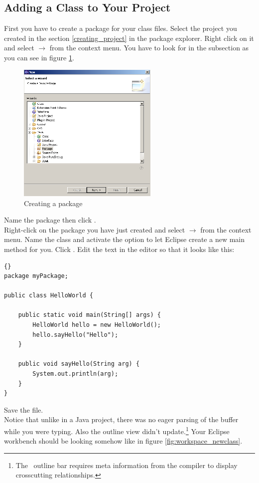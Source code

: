 \subsection{Adding a Class to Your Project}
First you have to create a package for your class files. Select the project you created in the section \ref{creating_project} in the package explorer. Right click on it and select  $\rightarrow$  from the context menu. You have to look for  in the  subsection as you can see in figure \ref{fig:package}.

\begin{figure}[htbp]
	\centering
		\includegraphics[width=0.60\textwidth]{images/package.png}
	\caption{Creating a package}
	\label{fig:package}
\end{figure}

Name the package  then click .\\
Right-click on the package you have just created and select  $\rightarrow$  from the context menu. Name the class  and activate the option to let Eclipse create a new main method for you. Click .
Edit the text in the editor so that it looks like this:
	\begin{lstlisting}[basicstyle=\small\it,caption=HelloWorld.java,label=lst:HelloWorld,name=listing:helloworld,frame=none]{}
package myPackage;

public class HelloWorld {

	public static void main(String[] args) {
		HelloWorld hello = new HelloWorld();
		hello.sayHello("Hello");
	}

	public void sayHello(String arg) {
		System.out.println(arg);
	}
}
\end{lstlisting}
Save the file.\\
Notice that unlike in a Java project, there was no eager parsing of the buffer while you were typing. Also the outline view didn't update.\footnote{The \caesarj ~outline bar requires meta information from the compiler to display crosscutting relationships.} Your Eclipse workbench should be looking somehow like in figure \ref{fig:workspace_newclass}.\\

